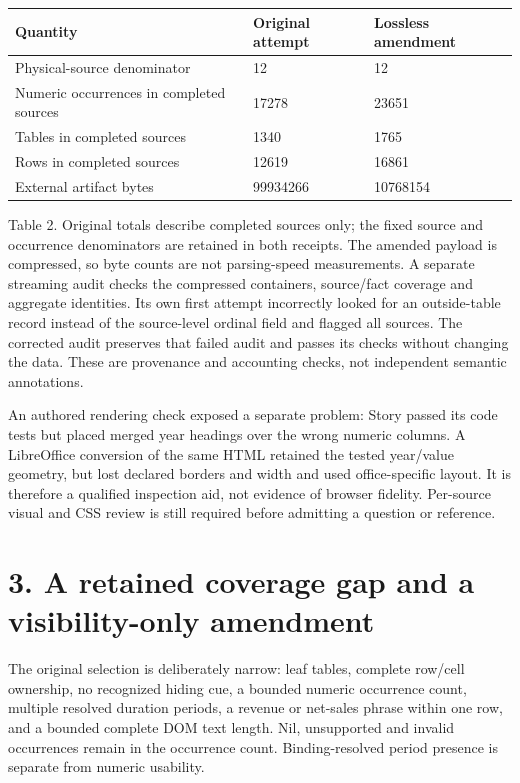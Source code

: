 \documentclass[10pt,a4paper]{article}
\begin{document}
\begin{longtable}{@{}p{}p{}p{}@{}}\toprule
\textbf{Quantity} & \textbf{Original attempt} & \textbf{Lossless amendment} \\ \midrule\endhead
Physical-source denominator & 12 & 12 \\
Numeric occurrences in completed sources & 17278 & 23651 \\
Tables in completed sources & 1340 & 1765 \\
Rows in completed sources & 12619 & 16861 \\
External artifact bytes & 99934266 & 10768154 \\
\bottomrule\end{longtable}
{\small Table 2. Original totals describe completed sources only; the fixed source and occurrence denominators are retained in both receipts. The amended payload is compressed, so byte counts are not parsing-speed measurements.}
A separate streaming audit checks the compressed containers, source/fact coverage and aggregate identities. Its own first attempt incorrectly looked for an outside-table record instead of the source-level ordinal field and flagged all sources. The corrected audit preserves that failed audit and passes its checks without changing the data. These are provenance and accounting checks, not independent semantic annotations.

An authored rendering check exposed a separate problem: Story passed its code tests but placed merged year headings over the wrong numeric columns. A LibreOffice conversion of the same HTML retained the tested year/value geometry, but lost declared borders and width and used office-specific layout. It is therefore a qualified inspection aid, not evidence of browser fidelity. Per-source visual and CSS review is still required before admitting a question or reference.

\clearpage
\section*{3. A retained coverage gap and a visibility-only amendment}
The original selection is deliberately narrow: leaf tables, complete row/cell ownership, no recognized hiding cue, a bounded numeric occurrence count, multiple resolved duration periods, a revenue or net-sales phrase within one row, and a bounded complete DOM text length. Nil, unsupported and invalid occurrences remain in the occurrence count. Binding-resolved period presence is separate from numeric usability.
\end{document}
